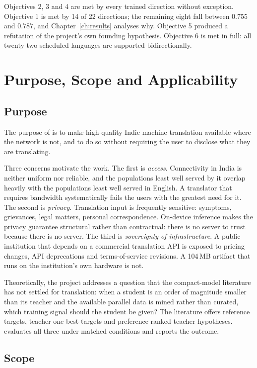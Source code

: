 Objectives 2, 3 and 4 are met by every trained direction without exception.
Objective 1 is met by 14 of 22 directions; the remaining eight fall between
0.755 and 0.787, and Chapter~\ref{ch:results} analyses why. Objective 5
produced a refutation of the project's own founding hypothesis. Objective 6 is
met in full: all twenty-two scheduled languages are supported bidirectionally.

\section{Purpose, Scope and Applicability}
\label{sec:psa}

\subsection{Purpose}
\label{subsec:purpose}

The purpose of \setu{} is to make high-quality Indic machine translation
available where the network is not, and to do so without requiring the user to
disclose what they are translating.

Three concerns motivate the work. The first is \emph{access}. Connectivity in
India is neither uniform nor reliable, and the populations least well served by
it overlap heavily with the populations least well served in English. A
translator that requires bandwidth systematically fails the users with the
greatest need for it. The second is \emph{privacy}. Translation input is
frequently sensitive: symptoms, grievances, legal matters, personal
correspondence. On-device inference makes the privacy guarantee structural
rather than contractual: there is no server to trust because there is no server.
The third is \emph{sovereignty of infrastructure}. A public institution that
depends on a commercial translation API is exposed to pricing changes, API
deprecations and terms-of-service revisions. A 104\,MB artifact that runs on the
institution's own hardware is not.

Theoretically, the project addresses a question that the compact-model
literature has not settled for translation: when a student is an order of
magnitude smaller than its teacher and the available parallel data is mined
rather than curated, which training signal should the student be given? The
literature offers reference targets, teacher one-best targets and
preference-ranked teacher hypotheses. \setu{} evaluates all three under matched
conditions and reports the outcome.

\subsection{Scope}
\label{subsec:scope}

